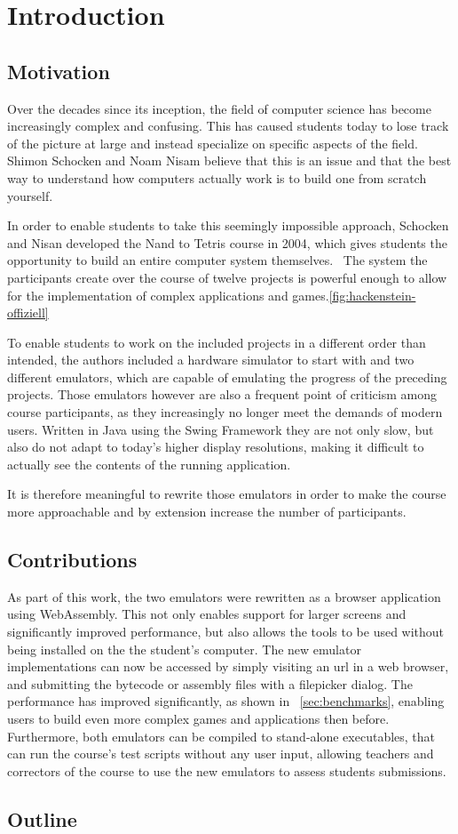 \section{Introduction}

\subsection{Motivation}

Over the decades since its inception, the field of computer science has become increasingly complex and confusing.
This has caused students today to lose track of the picture at large and instead specialize on specific aspects of the field.
Shimon Schocken and Noam Nisam believe that this is an issue and that the best way to understand how computers actually work is to build one from scratch yourself.~\cite[Preface]{nisan2005}

In order to enable students to take this seemingly impossible approach, Schocken and Nisan developed the Nand to Tetris course in 2004, which gives students the opportunity to build an entire computer system themselves.~\cite{1408798}
The system the participants create over the course of twelve projects is powerful enough to allow for the implementation of complex applications and games.\ref{fig:hackenstein-offiziell}

To enable students to work on the included projects in a different order than intended, the authors included a hardware simulator to start with and two different emulators, which are capable of emulating the progress of the preceding projects.
Those emulators however are also a frequent point of criticism among course participants, as they increasingly no longer meet the demands of modern users.
Written in Java using the Swing Framework they are not only slow, but also do not adapt to today's higher display resolutions, making it difficult to actually see the contents of the running application.

It is therefore meaningful to rewrite those emulators in order to make the course more approachable and by extension increase the number of participants.

\subsection{Contributions}

As part of this work, the two emulators were rewritten as a browser application using WebAssembly. This not only enables support for larger screens and significantly improved performance, but also allows the tools to be used without being installed on the the student's computer.
The new emulator implementations can now be accessed by simply visiting an url in a web browser, and submitting the bytecode or assembly files with a filepicker dialog. The performance has improved significantly, as shown in ~\cref{sec:benchmarks}, enabling users to build even more complex games and applications then before.
Furthermore, both emulators can be compiled to stand-alone executables, that can run the course's test scripts without any user input, allowing teachers and correctors of the course to use the new emulators to assess students submissions.

\subsection{Outline}
